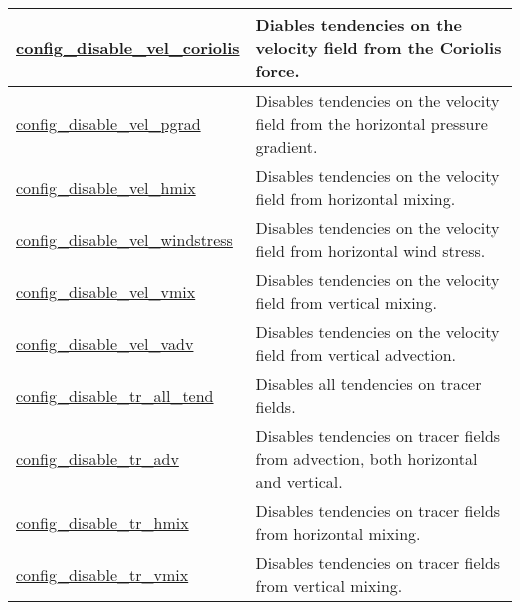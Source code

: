 {\begin{center}
\begin{longtable}{| p{2.0in} || p{4.0in} |}
	\hline
	\hyperref[subsec:nm_sec_config_disable_vel_coriolis]{config\_disable\_vel\_coriolis} & Diables tendencies on the velocity field from the Coriolis force. \\
	\hline
	\hyperref[subsec:nm_sec_config_disable_vel_pgrad]{config\_disable\_vel\_pgrad} & Disables tendencies on the velocity field from the horizontal pressure gradient. \\
	\hline
	\hyperref[subsec:nm_sec_config_disable_vel_hmix]{config\_disable\_vel\_hmix} & Disables tendencies on the velocity field from horizontal mixing. \\
	\hline
	\hyperref[subsec:nm_sec_config_disable_vel_windstress]{config\_disable\_vel\_windstress} & Disables tendencies on the velocity field from horizontal wind stress. \\
	\hline
	\hyperref[subsec:nm_sec_config_disable_vel_vmix]{config\_disable\_vel\_vmix} & Disables tendencies on the velocity field from vertical mixing. \\
	\hline
	\hyperref[subsec:nm_sec_config_disable_vel_vadv]{config\_disable\_vel\_vadv} & Disables tendencies on the velocity field from vertical advection. \\
	\hline
	\hyperref[subsec:nm_sec_config_disable_tr_all_tend]{config\_disable\_tr\_all\_tend} & Disables all tendencies on tracer fields. \\
	\hline
	\hyperref[subsec:nm_sec_config_disable_tr_adv]{config\_disable\_tr\_adv} & Disables tendencies on tracer fields from advection, both horizontal and vertical. \\
	\hline
	\hyperref[subsec:nm_sec_config_disable_tr_hmix]{config\_disable\_tr\_hmix} & Disables tendencies on tracer fields from horizontal mixing. \\
	\hline
	\hyperref[subsec:nm_sec_config_disable_tr_vmix]{config\_disable\_tr\_vmix} & Disables tendencies on tracer fields from vertical mixing. \\
	\hline
\end{longtable}
\end{center}
}
